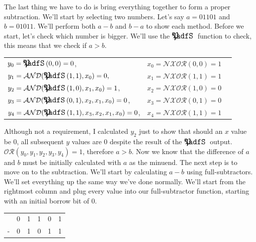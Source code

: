 \documentclass[oneside]{book}
\begin{document}
\tab
The last thing we have to do is bring everything together to form a proper subtraction. We'll start by selecting two numbers. Let's say $a=01101$ and $b=01011$. We'll perform both $a-b$ and $b-a$ to show each method. Before we start, let's check which number is bigger. We'll use the $\GreaterThan$ function to check, this means that we check if $a>b$.
\begin{center}
\begin{tabular}{l c c}
$y_0 = \GreaterThan(0,0) = 0$, & $x_0 = \mathcal{NXOR}(0,0) = 1$ \\
$y_1 = \mathcal{AND}(\GreaterThan(1,1),x_0) = 0,$ & $x_1 = \mathcal{NXOR}(1,1) = 1$ \\
$y_2 = \mathcal{AND}(\GreaterThan(1,0),x_1,x_0) = 1$, & $x_2 = \mathcal{NXOR}(1,0) = 0$ \\
$y_3 = \mathcal{AND}(\GreaterThan(0,1),x_2,x_1,x_0) = 0$, & $x_3 = \mathcal{NXOR}(0,1) = 0$ \\
$y_4 = \mathcal{AND}(\GreaterThan(1,1),x_3,x_2,x_1,x_0) = 0$, & $x_4 = \mathcal{NXOR}(1,1) = 1$
\end{tabular}
\end{center}
\tab
Although not a requirement, I calculated $y_2$ just to show that should an $x$ value be 0, all subsequent $y$ values are 0 despite the result of the $\GreaterThan$ output. $\mathcal{OR}(y_0,y_1,y_2,y_3,y_4) = 1$, therefore $a > b$. Now we know that the difference of $a$ and $b$ must be initially calculated with $a$ as the minuend. The next step is to move on to the subtraction.
\newline
\tab
We'll start by calculating $a-b$ using full-subtractors. We'll set everything up the same way we've done normally. We'll start from the rightmost column and plug every value into our full-subtractor function, starting with an initial borrow bit of 0.
\begin{center}
\begin{tabular}{c c c c c c}
& 0 & 1 & 1 & 0 & 1 \\
- & 0 & 1 & 0 & 1 & 1
\end{tabular}
\end{center}
\end{document}
